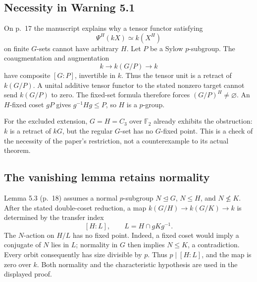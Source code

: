 \documentclass[10pt]{article}
\begin{document}
\subsection*{Necessity in Warning 5.1}
On p. 17 the manuscript explains why a tensor functor satisfying \[\Psi^H(kX)\simeq k(X^H)\] on finite \(G\)-sets cannot have arbitrary \(H\). Let \(P\) be a Sylow \(p\)-subgroup. The coaugmentation and augmentation \[k\longrightarrow k(G/P)\longrightarrow k\] have composite \([G:P]\), invertible in \(k\). Thus the tensor unit is a retract of \(k(G/P)\). A unital additive tensor functor to the stated nonzero target cannot send \(k(G/P)\) to zero. The fixed-set formula therefore forces \((G/P)^H\ne\varnothing\). An \(H\)-fixed coset \(gP\) gives \(g^{-1}Hg\le P\), so \(H\) is a \(p\)-group.\par
For the excluded extension, \(G=H=C_3\) over \(\mathbb F_2\) already exhibits the obstruction: \(k\) is a retract of \(kG\), but the regular \(G\)-set has no \(G\)-fixed point. This is a check of the necessity of the paper’s restriction, not a counterexample to its actual theorem.\par
\subsection*{The vanishing lemma retains normality}
Lemma 5.3 (p. 18) assumes a normal \(p\)-subgroup \(N\trianglelefteq G\), \(N\le H\), and \(N\nleq K\). After the stated double-coset reduction, a map \(k(G/H)\to k(G/K)\to k\) is determined by the transfer index \[[H:L],\qquad L=H\cap gKg^{-1}.\] The \(N\)-action on \(H/L\) has no fixed point. Indeed, a fixed coset would imply a conjugate of \(N\) lies in \(L\); normality in \(G\) then implies \(N\le K\), a contradiction. Every orbit consequently has size divisible by \(p\). Thus \(p\mid[H:L]\), and the map is zero over \(k\). Both normality and the characteristic hypothesis are used in the displayed proof.\par
\end{document}
